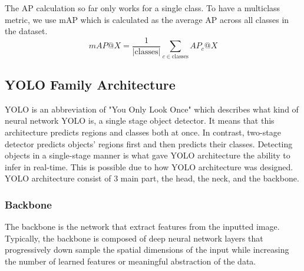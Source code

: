   The AP calculation so far only works for a single class. To have a multiclass metric, we use mAP
  which is calculated as the average AP across all classes in the dataset.
  \begin{equation}
    mAP@X = \frac{1}{|\text{classes}|} \sum_{c\in \text{classes}} AP_c@X
  \end{equation}


  \subsection{YOLO Family Architecture}
  YOLO is an abbreviation of "You Only Look Once" which describes what kind of neural network YOLO
  is, a single stage object detector. It means that this architecture predicts regions 
  and classes both at once. In contrast, two-stage detector predicts objects' regions first
  and then predicts their classes. Detecting objects in a single-stage manner is what gave YOLO
  architecture the ability to infer in real-time. This is possible due to how YOLO architecture
  was designed. YOLO architecture consist of 3 main part, the head, the neck, and the backbone.

   
    \subsubsection{Backbone}
    The backbone is the network that extract features from the inputted image.
    Typically, the backbone is composed of deep neural network layers that progressively 
    down sample the spatial dimensions of the input while increasing the number of 
    learned features or meaningful abstraction of the data.


